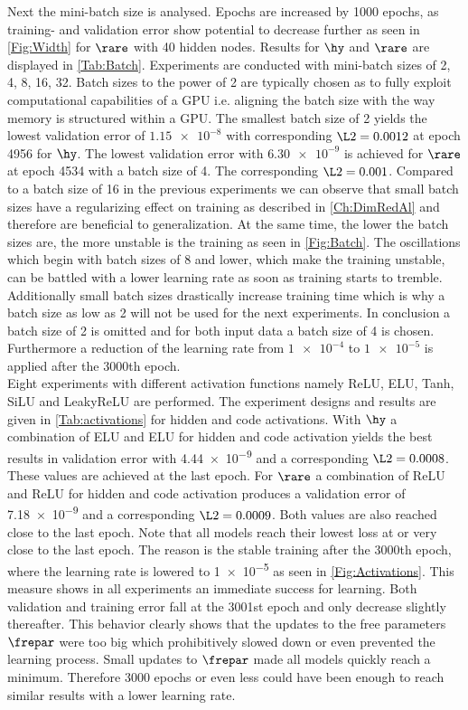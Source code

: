 Next the mini-batch size is analysed. Epochs are increased by 1000 epochs, as training- and validation error show potential to decrease further as seen in \cref{Fig:Width} for \(\rare\) with 40 hidden nodes. Results for $\hy$  and  $\rare$ are displayed in \cref{Tab:Batch}. Experiments are conducted with mini-batch sizes of 2, 4, 8, 16, 32. Batch sizes to the power of 2 are typically chosen as to fully exploit computational capabilities of a GPU i.e. aligning the batch size with the way memory is structured within a GPU. The smallest batch size of 2 yields the lowest validation error of \(\num{1.15e-8}\) with corresponding \(\L2 = 0.0012\) at epoch 4956 for \(\hy\). The lowest validation error with \(\num{6.30e-9}\) is achieved for \(\rare\) at epoch 4534 with a batch size of 4. The corresponding \(\L2 = 0.001\). Compared to a batch size of 16 in the previous experiments we can observe that small batch sizes have a regularizing effect on training as described in \cref{Ch:DimRedAl} and therefore are beneficial to generalization. At the same time, the lower the batch sizes are, the more unstable is the training as seen in \cref{Fig:Batch}. The oscillations which begin with batch sizes of 8 and lower, which make the training unstable, can be battled with a lower learning rate as soon as training starts to tremble. Additionally small batch sizes drastically increase training time which is why a batch size as low as 2 will not be used for the next experiments. In conclusion a batch size of 2 is omitted and for both input data a batch size of 4 is chosen. Furthermore a reduction of the learning rate from \(\num{1e-4}\) to \(\num{1e-5}\) is applied after the 3000th epoch.\\
Eight experiments with different activation functions namely ReLU, ELU, Tanh, SiLU and LeakyReLU are performed. The experiment designs and results are given in \cref{Tab:activations} for hidden and code activations. With \(\hy\) a combination of ELU and ELU for hidden and code activation yields the best results in validation error with \num{4.44e-9} and a corresponding \(\L2 = 0.0008\). These values are achieved at the last epoch. For \(\rare\) a combination of ReLU and ReLU for hidden and code activation produces a validation error of \num{7.18e-9} and a corresponding \(\L2 = 0.0009\). Both values are also reached close to the last epoch. Note that all models reach their lowest loss at or very close to the last epoch. The reason is the stable training after the 3000th epoch, where the learning rate is lowered to \num{1e-5} as seen in \cref{Fig:Activations}. This measure shows in all experiments an immediate success for learning. Both validation and training error fall at the 3001st epoch and only decrease slightly thereafter. This behavior clearly shows that the updates to the free parameters \(\frepar\) were too big which prohibitively slowed down or even prevented the learning process. Small updates to \(\frepar\) made all models quickly reach a minimum. Therefore 3000 epochs or even less could have been enough to reach similar results with a lower learning rate.\\
